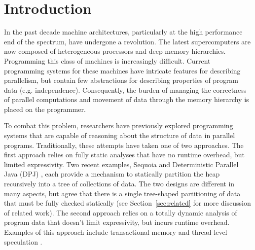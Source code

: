 

\section{Introduction}
\label{sec:intro}

In the past decade machine architectures, particularly at the high
performance end of the spectrum, have undergone a revolution.  The
latest supercomputers are now composed of heterogeneous processors
and deep memory hierarchies.  Programming this class of machines is
increasingly difficult.  Current programming systems for these
machines have intricate features for describing parallelism, but contain
few abstractions for describing properties of program data
(e.g. independence).  Consequently, the burden of managing
the correctness of parallel computations and movement of data
through the memory hierarchy is placed on the programmer.


To combat this problem, researchers have previously explored programming
systems that are capable of reasoning about the structure of data in
parallel programs.  Traditionally, these attempts have taken one of two approaches.   
The first approach relies on fully static analyses that
have no runtime overhead, but limited expressivity.  Two recent examples, 
Sequoia \cite{Fatahalian06} and 
Deterministic Parallel Java (DPJ) \cite{Bocchino09}, each provide a 
mechanism to statically partition the heap recursively into a tree of collections 
of data.  The two designs are different in many aspects, but agree that there is
a single tree-shaped partitioning of data that must be fully checked statically 
(see Section~\ref{sec:related} for more discussion of related work).  The
second approach relies on a totally dynamic analysis of program data that doesn't
limit expressivity, but incurs runtime overhead.  Examples of this approach 
include transactional memory \cite{Harris05} and thread-level speculation \cite{Steffan00}.

